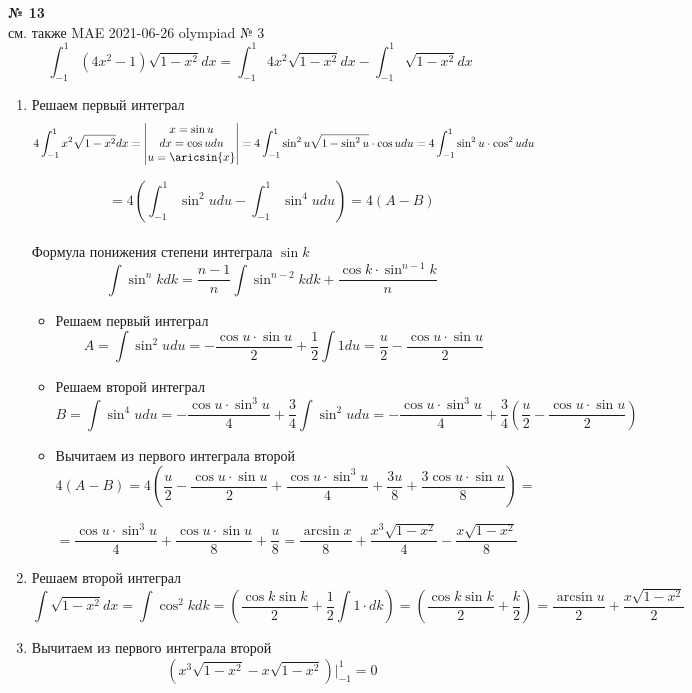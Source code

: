 \documentclass{article}
\begin{document}
\textbf{№ 13} 
\\
см. также {\color{red}MAE} 2021-06-26 olympiad № 3
\\
$$ \int_{-1}^{1} (4x^2-1)\sqrt{1-x^2} dx 
= \int_{-1}^{1} 4x^2\sqrt{1-x^2} dx - \int_{-1}^{1} \sqrt{1-x^2} dx $$

\begin{enumerate}
\item Решаем первый интеграл
$$ 4\int_{-1}^{1} x^2\sqrt{1-x^2} dx
= \begin{vmatrix} x = \sin{u} \\
                 dx = \cos{u} du \\
                  u = \aricsin{x}\end{vmatrix} 
= 4\int_{-1}^{1} \sin^2{u}\sqrt{1-\sin^2{u}} \cdot \cos{u} du 
= 4\int_{-1}^{1} \sin^2{u} \cdot \cos^2{u} du $$

$$ = 4 \left( \int_{-1}^{1} \sin^2{u} du - \int_{-1}^{1} \sin^4{u} du \right)
= 4 \left( A - B \right) $$
\\
Формула понижения степени интеграла $\sin{k}$
$$ \int \sin^{n}{k}dk
= \frac{n-1}{n} \int \sin^{n-2}{k}dk + \frac{\cos{k} \cdot \sin^{n-1}{k}}{n} $$

\begin{itemize}
\item Решаем первый интеграл
$$ A 
= \int \sin^2{u} du 
= -\frac{\cos{u} \cdot \sin{u}}{2} + \frac{1}{2} \int 1du
= \frac{u}{2} - \frac{\cos{u} \cdot \sin{u}}{2} $$

\item Решаем второй интеграл
$$ B
= \int \sin^4{u} du 
= -\frac{\cos{u} \cdot \sin^3{u}}{4} + \frac{3}{4} \int \sin^2{u} du
= -\frac{\cos{u} \cdot \sin^3{u}}{4} + \frac{3}{4} \left( \frac{u}{2} - \frac{\cos{u} \cdot \sin{u}}{2} \right) $$

\item Вычитаем из первого интеграла второй
$$ 4 \left( A - B \right)
= 4 \left( \frac{u}{2} - \frac{\cos{u} \cdot \sin{u}}{2} + \frac{\cos{u} \cdot \sin^3{u}}{4} + \frac{3u}{8} + \frac{3 \cos{u} \cdot \sin{u}}{8} \right)
= $$

$$ = \frac{\cos{u} \cdot \sin^3{u}}{4} + \frac{\cos{u} \cdot \sin{u}}{8} + \frac{u}{8}
= \frac{\arcsin{x}}{8} + \frac{x^3\sqrt{1-x^2}}{4} - \frac{x\sqrt{1-x^2}}{8} $$
\end{itemize}


\item Решаем второй интеграл
$$ \int \sqrt{1-x^2} dx
= \int \cos^2{k} dk
= \left( \frac{\cos{k}\sin{k}}{2} + \frac{1}{2} \int 1 \cdot dk \right)
= \left( \frac{\cos{k}\sin{k}}{2} + \frac{k}{2} \right) 
= \frac{\arcsin{u}}{2} + \frac{x\sqrt{1-x^2}}{2} $$

\item Вычитаем из первого интеграла второй
$$ \left( x^3\sqrt{1-x^2} - x\sqrt{1-x^2} \right) \bigg\vert_{-1}^{1} 
= 0 $$

\end{enumerate}
\end{document}
